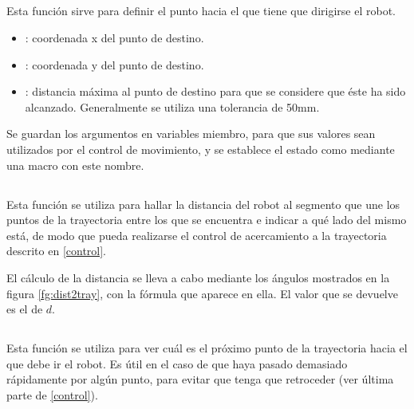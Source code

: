 \subsection{}

\noindent
{}

\noindent
Esta función sirve para definir el punto hacia el que tiene que dirigirse el robot.

\begin{itemize}
  \item {}: coordenada x del punto de destino.
  \item {}: coordenada y del punto de destino.
  \item {}: distancia máxima al punto de destino para que se considere que éste ha sido alcanzado. Generalmente se utiliza una tolerancia de 50mm.
\end{itemize}

\noindent
Se guardan los argumentos en variables miembro, para que sus valores sean utilizados por el control de movimiento, y se establece el estado como  mediante una macro con este nombre.

\subsection{}

\noindent
{}

\noindent
Esta función se utiliza para hallar la distancia del robot al segmento que une los puntos de la trayectoria entre los que se encuentra e indicar a qué lado del mismo está, de modo que pueda realizarse el control de acercamiento a la trayectoria descrito en \ref{control}.

\noindent
El cálculo de la distancia se lleva a cabo mediante los ángulos mostrados en la figura \ref{fg:dist2tray}, con la fórmula que aparece en ella. El valor que se devuelve es el de $d$.

\subsection{}

\noindent
{}

\noindent
Esta función se utiliza para ver cuál es el próximo punto de la trayectoria hacia el que debe ir el robot. Es útil en el caso de que haya pasado demasiado rápidamente por algún punto, para evitar que tenga que retroceder (ver última parte de \ref{control}).

